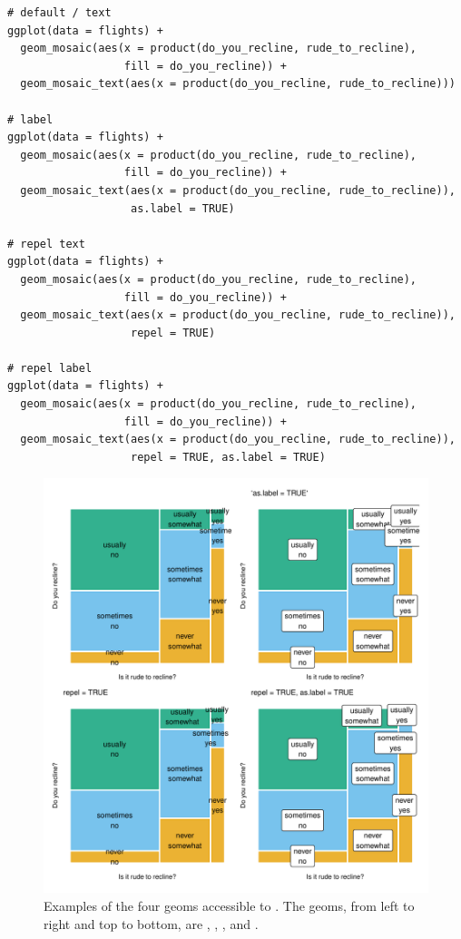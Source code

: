 \begin{verbatim}
# default / text
ggplot(data = flights) +
  geom_mosaic(aes(x = product(do_you_recline, rude_to_recline), 
                  fill = do_you_recline)) +
  geom_mosaic_text(aes(x = product(do_you_recline, rude_to_recline)))

# label
ggplot(data = flights) +
  geom_mosaic(aes(x = product(do_you_recline, rude_to_recline), 
                  fill = do_you_recline)) +
  geom_mosaic_text(aes(x = product(do_you_recline, rude_to_recline)), 
                   as.label = TRUE)
  
# repel text
ggplot(data = flights) +
  geom_mosaic(aes(x = product(do_you_recline, rude_to_recline), 
                  fill = do_you_recline)) +
  geom_mosaic_text(aes(x = product(do_you_recline, rude_to_recline)), 
                   repel = TRUE)
  
# repel label
ggplot(data = flights) +
  geom_mosaic(aes(x = product(do_you_recline, rude_to_recline),
                  fill = do_you_recline)) +
  geom_mosaic_text(aes(x = product(do_you_recline, rude_to_recline)), 
                   repel = TRUE, as.label = TRUE)
\end{verbatim}

\begin{figure}

{\centering \includegraphics[width=1\linewidth]{jeppson-hofmann_files/figure-latex/label-opts-1} 

}

\caption{Examples of the four geoms accessible to . The geoms, from left to right and top to bottom, are , , , and .}\label{fig:label-opts}
\end{figure}

